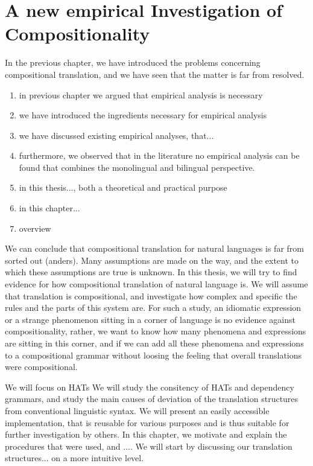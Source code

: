 \documentclass{report}
\begin{document}
\chapter{A new empirical Investigation of Compositionality}

In the previous chapter, we have introduced the problems concerning compositional translation, and we have seen that the matter is far from resolved. 

\begin{enumerate}
\item in previous chapter we argued that empirical analysis is necessary
\item we have introduced the ingredients necessary for empirical analysis
\item we have discussed existing empirical analyses, that...
\item furthermore, we observed that in the literature no empirical analysis can be found that combines the monolingual and bilingual perspective.
\item in this thesis..., both a theoretical and practical purpose
\item in this chapter...
\item overview
\end{enumerate}

We can conclude that compositional translation for natural languages is far from sorted out (anders). Many assumptions are made on the way, and the extent to which these assumptions are true is unknown. In this thesis, we will try to find evidence for how compositional translation of natural language is. We will assume that translation is compositional, and investigate how complex and specific the rules and the parts of this system are. For such a study, an idiomatic expression or a strange phenomenon sitting in a corner of language is no evidence against compositionality, rather, we want to know how many phenomena and expressions are sitting in this corner, and if we can add all these phenomena and expressions to a compositional grammar without loosing the feeling that overall translations were compositional.


We will focus on HATs
We will study the consitency of HATs and dependency grammars, and study the main causes of deviation of the translation structures from conventional linguistic syntax. We will present an easily accessible implementation, that is reusable for various purposes and is thus suitable for further investigation by others. In this chapter, we motivate and explain the procedures that were used, and .... We will start by discussing our translation structures... on a more intuitive level.
\end{document}
